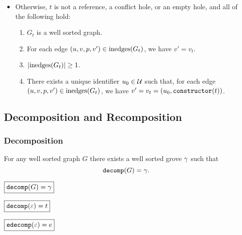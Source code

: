 \begin{definition}
\begin{itemize}
    \item Otherwise, $t$ is not a reference, a conflict hole, or an empty hole, and all of the following hold:
      \begin{enumerate}
        \item $G_t$ is a well sorted graph.
        \item For each edge $(u, v, p, v') \in \text{inedges}\mathopen{}\left(G_t\right)\mathclose{}$, we have $v' = v_t$.
        \item $\left\lvert\text{inedges}\mathopen{}\left(G_t\right)\mathclose{}\right\rvert \geq 1$.
        \item There exists a unique identifier $u_0 \in \mathcal{U}$ such that,
          for each edge $(u, v, p, v') \in \text{inedges}\mathopen{}\left(G_t\right)\mathclose{}$,
          we have $v' = v_t = (u_0, \operatorname{\texttt{constructor}}\mathopen{}\left(t\right)\mathclose{})$.
      \end{enumerate}
  \end{itemize}
\end{definition}


\subsection{Decomposition and Recomposition}


\subsubsection{Decomposition}

\begin{theorem}
  For any well sorted graph $G$
  there exists a well sorted grove $\gamma$
  such that \[\operatorname{\texttt{decomp}}\mathopen{}\left(G\right)\mathclose{} = \gamma.\]
\end{theorem}


\noindent $\boxed{\operatorname{\texttt{decomp}}\mathopen{}\left(G\right)\mathclose{} = \gamma}$
%
\figureDecompositionDefDecomp

\noindent $\boxed{\operatorname{\texttt{decomp}}\mathopen{}\left(\varepsilon\right)\mathclose{} = t}$
%
\figureDecompositionDefDecompTerm

\noindent $\boxed{\operatorname{\texttt{edecomp}}\mathopen{}\left(\varepsilon\right)\mathclose{} = e}$
%
\figureDecompositionDefEdecomp

